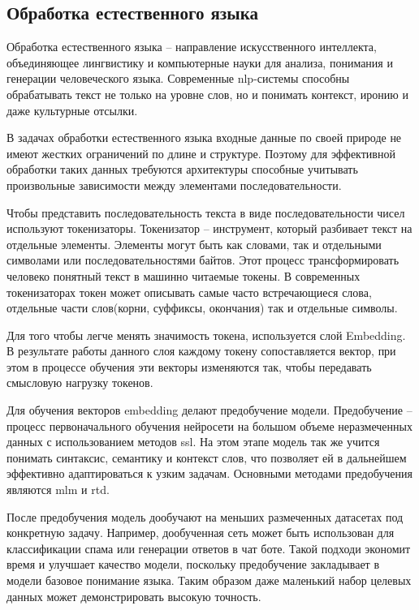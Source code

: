 \documentclass[../part_1.tex]{subfiles}
\begin{document}
\subsection{Обработка естественного языка}
\par Обработка естественного языка -- направление искусственного интеллекта, объединяющее лингвистику и компьютерные науки для анализа, понимания и генерации человеческого языка. Современные \acrshort{nlp}-системы способны обрабатывать текст не только на уровне слов, но и понимать контекст, иронию и даже культурные отсылки.
\par В задачах обработки естественного языка входные данные по своей природе не имеют жестких ограничений по длине и структуре. Поэтому для эффективной обработки таких данных требуются архитектуры способные учитывать произвольные зависимости между элементами последовательности. 
\par Чтобы представить последовательность текста в виде последовательности чисел используют токенизаторы. Токенизатор -- инструмент, который разбивает текст на отдельные элементы. Элементы могут быть как словами, так и отдельными символами или последовательностями байтов. Этот процесс трансформировать человеко понятный текст в машинно читаемые токены. В современных токенизаторах токен может описывать самые часто встречающиеся слова, отдельные части слов(корни, суффиксы, окончания) так и отдельные символы. 
\par Для того чтобы легче менять значимость токена, используется слой Embedding. В результате работы данного слоя каждому токену сопоставляется вектор, при этом в процессе обучения эти векторы изменяются так, чтобы передавать смысловую нагрузку токенов. %
\par Для обучения векторов embedding делают предобучение модели. Предобучение -- процесс первоначального обучения нейросети на большом объеме неразмеченных данных с использованием методов \acrfull{ssl}. На этом этапе модель так же учится понимать синтаксис, семантику и контекст слов, что позволяет ей в дальнейшем эффективно адаптироваться к узким задачам. Основными методами предобучения являются \acrshort{mlm}\cite{sinha2021maskedlanguagemodelingdistributional} и \acrshort{rtd}.
\par После предобучения модель дообучают на меньших размеченных датасетах под конкретную задачу. Например, дообученная сеть может быть использован для классификации спама или генерации ответов в чат боте. Такой подходи экономит время и улучшает качество модели, поскольку предобучение закладывает в модели базовое понимание языка. Таким образом даже маленький набор целевых данных может демонстрировать высокую точность.
\end{document}
